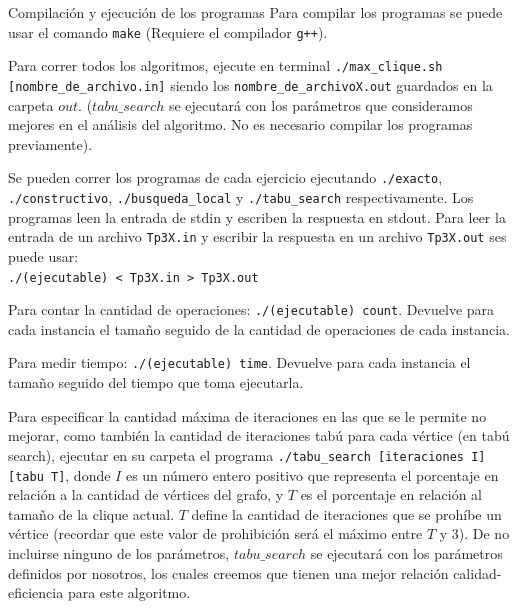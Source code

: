\documentclass[12pt,titlepage]{article}
\begin{document}
	\begin{section}{Compilación y ejecución de los programas}
	Para compilar los programas se puede usar el comando \texttt{make} (Requiere el compilador \texttt{g++}).
	
	Para correr todos los algoritmos, ejecute en terminal \texttt{./max\_clique.sh [nombre\_de\_archivo.in]} siendo los \texttt{nombre\_de\_archivoX.out} guardados en la carpeta $out$. ($tabu\_search$ se ejecutará con los parámetros que consideramos mejores en el análisis del algoritmo. No es necesario compilar los programas previamente).
		
	Se pueden correr los programas de cada ejercicio ejecutando \texttt{./exacto}, \texttt{./constructivo}, \texttt{./busqueda\_local} y \texttt{./tabu\_search} respectivamente. Los programas leen la entrada de stdin y escriben la respuesta en stdout. Para leer la entrada de un archivo \texttt{Tp3X.in} y escribir la respuesta en un archivo \texttt{Tp3X.out} ses puede usar:\\ \texttt{./(ejecutable) < Tp3X.in > Tp3X.out}

	Para contar la cantidad de operaciones: \texttt{./(ejecutable) count}. Devuelve para cada instancia el tamaño seguido de la cantidad de operaciones de cada instancia.

	Para medir tiempo: \texttt{./(ejecutable) time}. Devuelve para cada instancia el tamaño seguido del tiempo que toma ejecutarla.

	Para especificar la cantidad máxima de iteraciones en las que se le permite no mejorar, como también la cantidad de iteraciones tabú para cada vértice (en tabú search), ejecutar en su carpeta el programa \texttt{./tabu\_search [iteraciones \texttt{I}] [tabu \texttt{T}]}, donde $I$ es un número entero positivo que representa el porcentaje en relación a la cantidad de vértices del grafo, y $T$ es el porcentaje en relación al tamaño de la clique actual. $T$ define la cantidad de iteraciones que se prohíbe un vértice (recordar que este valor de prohibición será el máximo entre $T$ y 3).
	De no incluirse ninguno de los parámetros, $tabu\_search$ se ejecutará con los parámetros definidos por nosotros, los cuales creemos que tienen una mejor relación calidad-eficiencia para este algoritmo.

	\end{section}
\end{document}
